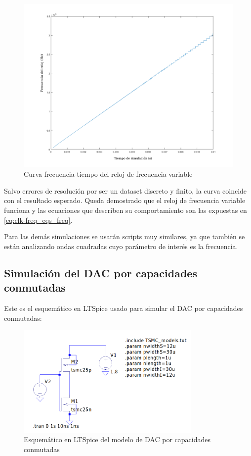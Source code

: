 \documentclass[12pt]{report} %
\begin{document}
	\begin{figure}[H]
		\centerline{\includegraphics[width=1.1\textwidth]{ml-clk-freq-curve.png}}
		\caption[Curva frecuencia-tiempo del reloj de frecuencia variable]{Curva frecuencia-tiempo del reloj de frecuencia variable}
		\label{fig:ml-clk-freq-curve.png}
	\end{figure}

	Salvo errores de resolución por ser un dataset discreto y finito, la curva coincide con el resultado esperado. Queda demostrado que el reloj de frecuencia variable funciona y las ecuaciones que describen su comportamiento son las expuestas en \ref{eq:clk-freq_eqs_freq}.
	
	Para las demás simulaciones se usarán scripts muy similares, ya que también se están analizando ondas cuadradas cuyo parámetro de interés es la frecuencia.	


	\subsection{Simulación del DAC por capacidades conmutadas}
	
	Este es el esquemático en LTSpice usado para simular el DAC por capacidades conmutadas:
	
	\begin{figure}[H]
		\includegraphics[width=0.8\textwidth]{ltspice-sw-cap-empty.png}
		\caption[Esquemático en LTSpice del modelo de DAC por capacidades conmutadas]{Esquemático en LTSpice del modelo de DAC por capacidades conmutadas}
		\label{fig:ltspice-sw-cap-empty.png}
	\end{figure}
	
\end{document}
